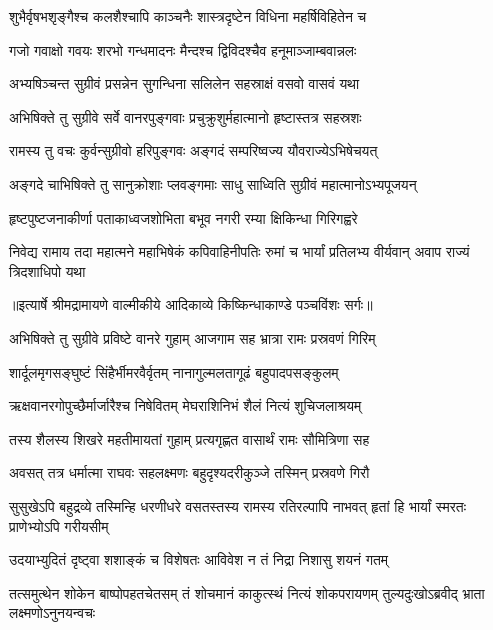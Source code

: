 \twolineshloka
{शुभैर्वृषभशृङ्गैश्च कलशैश्चापि काञ्चनैः}
{शास्त्रदृष्टेन विधिना महर्षिविहितेन च} %

\twolineshloka
{गजो गवाक्षो गवयः शरभो गन्धमादनः}
{मैन्दश्च द्विविदश्चैव हनूमाञ्जाम्बवान्नलः} %

\twolineshloka
{अभ्यषिञ्चन्त सुग्रीवं प्रसन्नेन सुगन्धिना}
{सलिलेन सहस्राक्षं वसवो वासवं यथा} %

\twolineshloka
{अभिषिक्ते तु सुग्रीवे सर्वे वानरपुङ्गवाः}
{प्रचुक्रुशुर्महात्मानो हृष्टास्तत्र सहस्रशः} %

\twolineshloka
{रामस्य तु वचः कुर्वन्सुग्रीवो हरिपुङ्गवः}
{अङ्गदं सम्परिष्वज्य यौवराज्येऽभिषेचयत्} %

\twolineshloka
{अङ्गदे चाभिषिक्ते तु सानुक्रोशाः प्लवङ्गमाः}
{साधु साध्विति सुग्रीवं महात्मानोऽभ्यपूजयन्} %

\twolineshloka
{हृष्टपुष्टजनाकीर्णा पताकाध्वजशोभिता}
{बभूव नगरी रम्या क्षिकिन्धा गिरिगह्वरे} %

\fourlineindentedshloka
{निवेद्य रामाय तदा महात्मने}
{महाभिषेकं कपिवाहिनीपतिः}
{रुमां च भार्यां प्रतिलभ्य वीर्यवान्}
{अवाप राज्यं त्रिदशाधिपो यथा} %


{॥इत्यार्षे श्रीमद्रामायणे वाल्मीकीये आदिकाव्ये किष्किन्धाकाण्डे पञ्चविंशः सर्गः॥}


\twolineshloka
{अभिषिक्ते तु सुग्रीवे प्रविष्टे वानरे गुहाम्}
{आजगाम सह भ्रात्रा रामः प्रस्रवणं गिरिम्} %

\twolineshloka
{शार्दूलमृगसङ्घुष्टं सिंहैर्भीमरवैर्वृतम्}
{नानागुल्मलतागूढं बहुपादपसङ्कुलम्} %

\twolineshloka
{ऋक्षवानरगोपुच्छैर्मार्जारैश्च निषेवितम्}
{मेघराशिनिभं शैलं नित्यं शुचिजलाश्रयम्} %

\twolineshloka
{तस्य शैलस्य शिखरे महतीमायतां गुहाम्}
{प्रत्यगृह्णत वासार्थं रामः सौमित्रिणा सह} %

\twolineshloka
{अवसत् तत्र धर्मात्मा राघवः सहलक्ष्मणः}
{बहुदृश्यदरीकुञ्जे तस्मिन् प्रस्रवणे गिरौ} %

\threelineshloka
{सुसुखेऽपि बहुद्रव्ये तस्मिन्हि धरणीधरे}
{वसतस्तस्य रामस्य रतिरल्पापि नाभवत्}
{हृतां हि भार्यां स्मरतः प्राणेभ्योऽपि गरीयसीम्} %

\twolineshloka
{उदयाभ्युदितं दृष्ट्वा शशाङ्कं च विशेषतः}
{आविवेश न तं निद्रा निशासु शयनं गतम्} %

\threelineshloka
{तत्समुत्थेन शोकेन बाष्पोपहतचेतसम्}
{तं शोचमानं काकुत्स्थं नित्यं शोकपरायणम्}
{तुल्यदुःखोऽब्रवीद् भ्राता लक्ष्मणोऽनुनयन्वचः} %

